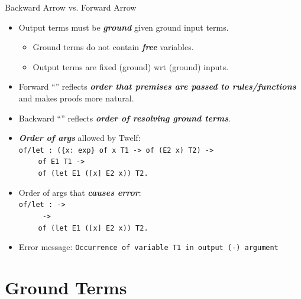 \documentclass{beamer}
\renewcommand{\emph}[1]{\textbf{\textit{#1}}}
\begin{document}
\begin{frame}{Backward Arrow vs. Forward Arrow}
\begin{itemize}
\item Output terms must be \emph{ground} given
ground input terms.
  \begin{itemize}
  \item Ground terms do not contain \emph{free} variables.
  \item Output terms are fixed (ground) wrt (ground) inputs.
  \end{itemize}

\item Forward ``\texttt{\cemph{->}}'' reflects
\emph{order that premises are passed to rules/functions}
and makes proofs more natural.

\item Backward ``\texttt{\cemph{<-}}'' reflects
\emph{order of resolving ground terms}.

\pause
\item \emph{Order of args} allowed by Twelf: \\
\texttt{of/let : (\{x: exp\} of x T1 -> of (E2 x) T2) ->} \\
$\qquad$ \texttt{of E1 T1 ->} \\
$\qquad$ \texttt{of (let E1 ([x] E2 x)) T2.}

\pause
\item Order of args that \emph{causes error}: \\
\texttt{of/let :  ->} \\
$\qquad$ \texttt{ ->} \\
$\qquad$ \texttt{of (let E1 ([x] E2 x)) T2.}

\pause
\item Error message:
\texttt{Occurrence of variable T1 in output (-) argument
}
\end{itemize}
\end{frame}


\section{Ground Terms}
\end{document}
